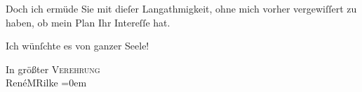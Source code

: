\pstart
           Doch ich ermüde Sie mit dieſer Langathmigkeit, ohne mich vorher vergewiſſert zu
               haben, ob mein Plan Ihr Intereſſe hat.\pend
           
\pstart
           Ich wünſchte es von ganzer Seele!\pend
           
\pstart
           In größter \textsc{Verehrung}{\\[\baselineskip]}\spacefill\mbox{RenéMRilke}\pend
           \leftskip=0em{}\endnumbering{}  \newcommand{\dateiname}{L04534}\newcommand{\titel}{Rainer Maria Rilke an Arthur Schnitzler, [Anfang?] April 1896}\newcommand{\editorInnen}{Herausgegeben von Jahnke, SelmaMüller, Martin Anton}
